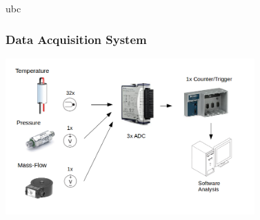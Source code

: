 \documentclass[10pt]{beamer}
\begin{document}
\begin{frame}{ubc}
\frametitle{Data Acquisition System}

\center\includegraphics[height=6cm]{sch.png}
\end{frame}


\end{document}
